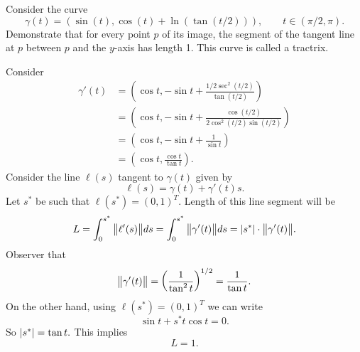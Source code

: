 \begin{problem}[Exercise 1.4]
	Consider the curve
	\[ \gamma(t) = (\sin(t), \cos(t)+\ln(\tan(t/2))), \qquad t\in(\pi/2,\pi). \]
	Demonstrate that for every point $ p $ of its image, the segment of the tangent line at $ p $ between $ p $ and the $ y $-axis has length 1. This curve is called a tractrix.
\end{problem}
\begin{solution}
	Consider 
	\begin{align*}
		\gamma'(t) &= (\cos t, -\sin t + \frac{1/2\sec^2(t/2)}{\tan (t/2)}) \\
		&= (\cos t, -\sin t+ \frac{\cos(t/2)}{2\cos^2(t/2)\sin(t/2)}) \\
		&=(\cos t, -\sin t + \frac{1}{\sin t}) \\
		&=(\cos t, \frac{\cos t}{\tan t}).
	\end{align*}
	Consider the line $ \ell(s) $ tangent to $ \gamma(t) $ given by
	\[ \ell(s) = \gamma(t) + \gamma'(t) s. \]
	Let $ s^* $ be such that $ \ell(s^*) = (0,1)^T  $. Length of this line segment will be
	\[ L = \int_0^{s^*} \norm{\ell'(s)}ds = \int_0^{s^*} \norm{\gamma'(t)} ds = |s^*| \cdot \norm{\gamma'(t)}. \]
	Observer that
	\[ \norm{\gamma'(t)} = \left( \frac{1}{\tan^2 t} \right)^{1/2} = \frac{1}{\tan t}. \]
	On the other hand, using $ \ell(s^*) = (0,1)^T $ we can write
	\[ \sin t + s^*t \cos t = 0. \]
	So $ |s^*| = \tan t. $
	This implies 
	\[ L = 1. \]
\end{solution}